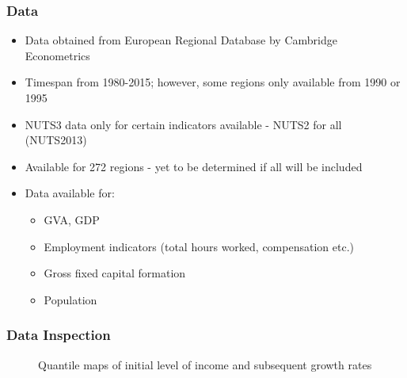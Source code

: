 \documentclass{beamer}
\begin{document}
\begin{frame}
  \frametitle{Data}
  \begin{itemize}
  \item Data obtained from European Regional Database by Cambridge Econometrics
  \item Timespan from 1980-2015; however, some regions only available from 1990 or 1995
  \item NUTS3 data only for certain indicators available - NUTS2 for all (NUTS2013)
  \item Available for 272 regions - yet to be determined if all will be included
  \item Data available for:
    \begin{itemize}
    \item GVA, GDP 
    \item Employment indicators (total hours worked, compensation etc.)
    \item Gross fixed capital formation
    \item Population
    \end{itemize}
  \end{itemize}
\end{frame}

\begin{frame}
  \frametitle{Data Inspection}
  \begin{figure}%
    \centering
    \qquad
    \caption{Quantile maps of initial level of income and subsequent growth rates}%
    \label{fig:quantile}%
  \end{figure}
\end{frame}
\end{document}
